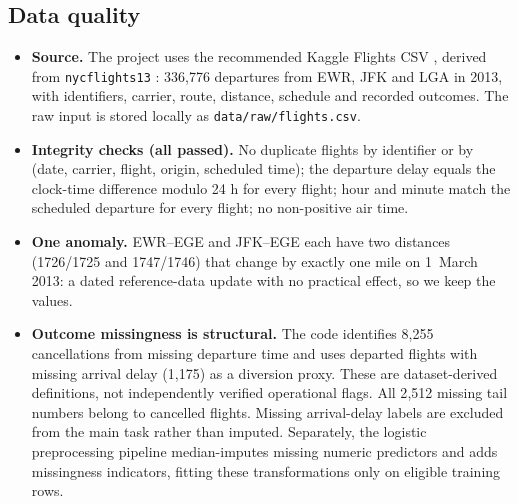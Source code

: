 \documentclass[conference]{IEEEtran}
\begin{document}
\subsection{Data quality}
\begin{itemize}
\item \textbf{Source.} The project uses the recommended Kaggle Flights CSV \cite{kaggleflights}, derived from \texttt{nycflights13} \cite{wickham2021nycflights13}: 336{,}776 departures from EWR, JFK and LGA in 2013, with identifiers, carrier, route, distance, schedule and recorded outcomes. The raw input is stored locally as \texttt{data/raw/flights.csv}.
\item \textbf{Integrity checks (all passed).} No duplicate flights by identifier or by (date, carrier, flight, origin, scheduled time); the departure delay equals the clock-time difference modulo 24 h for every flight; hour and minute match the scheduled departure for every flight; no non-positive air time.
\item \textbf{One anomaly.} EWR--EGE and JFK--EGE each have two distances (1726/1725 and 1747/1746) that change by exactly one mile on 1~March 2013: a dated reference-data update with no practical effect, so we keep the values.
\item \textbf{Outcome missingness is structural.} The code identifies 8{,}255 cancellations from missing departure time and uses departed flights with missing arrival delay (1{,}175) as a diversion proxy. These are dataset-derived definitions, not independently verified operational flags. All 2{,}512 missing tail numbers belong to cancelled flights. Missing arrival-delay labels are excluded from the main task rather than imputed. Separately, the logistic preprocessing pipeline median-imputes missing numeric predictors and adds missingness indicators, fitting these transformations only on eligible training rows.
\end{itemize}
\end{document}
